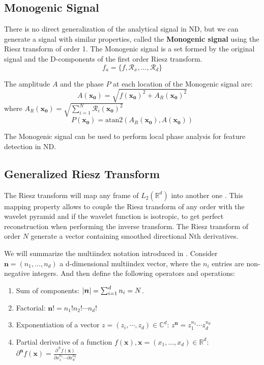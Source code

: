 \documentclass{InsightArticle}
\theoremstyle{definition}
\def\vn{\bm{n}} %
\def\vx{\bm{x}} %
\begin{document}
\subsection{Monogenic Signal}
\label{sub:monogenic}

There is no direct generalization of the analytical signal in ND, but we can generate a signal with similar properties, called the \textbf{Monogenic signal} using the Riesz transform of order 1\cite{felsberg_monogenic_2001, kovesi_image_1999}.
The Monogenic signal is a set formed by the original signal and the D-components of the first order Riesz transform.
\begin{equation}
  f_a = \{f, \mathcal{R}_x, ..., \mathcal{R}_d\}
\end{equation}

The amplitude $A$ and the phase $P$ at each location of the Monogenic signal are:
\begin{equation}
\label{eq:monogenic_amplitude}
 A(\mathbf{x_0})= \sqrt{f(\mathbf{x_0})^2 + A_R(\mathbf{x_0})^2 }
\end{equation}
where $ A_R(\mathbf{x_0})=  \sqrt{\sum_{i=1}^N \mathcal{R}_i(\mathbf{x_0})^2} $
\begin{equation}
\label{eq:monogenic_phase}
P(\mathbf{x_0})= \text{atan2}(A_R(\mathbf{x_0}),A(\mathbf{x_0}))
\end{equation}

The Monogenic signal can be used to perform local phase analysis for feature detection in ND.

\subsection{Generalized Riesz Transform}
\label{sub:generalized_riesz}
The Riesz transform will map any frame of $L_2(\mathbb{R}^d)$ into another one \cite{held_steerable_2010, unser_wavelet_2010}. This mapping property allows to couple the Riesz transform of any order with the wavelet pyramid and if the wavelet function is isotropic, to get perfect reconstruction when performing the inverse transform. The Riesz transform of order $N$ generate a vector containing smoothed directional Nth derivatives.

We will summarize the multiindex notation introduced in \cite{unser_steerable_2011}.\newline
Consider $ \vn = (n_{1}, \ldots, n_{d})$ a d-dimensional multiindex vector, where the $n_i$ entries are non-negative integers. And then define the following operators and operations:
\begin{enumerate}[topsep=0pt]
  \item Sum of components: $\abs{\bm{n}} = \sum_{i=1}^d n_i = N$.
  \item Factorial: $\vn! = n_1!n_2!\cdots n_d!$
  \item Exponentiation of a vector $z = (z_i,\cdots,z_d) \in \mathbb{C}^d$:
    $z^{\vn} = z_{1}^{n_1} \cdots z_{d}^{n_d}$
  \item Partial derivative of a function $f(\vx), \vx = (x_1,\ldots, x_d) \in \mathbb{R}^d$:
    $\partial^{\vn}f(\vx) = \frac{\partial^{N}f(\vx)}{\partial x_{1}^{n_1}\cdots \partial x_{d}^{n_d}}$
\end{enumerate}
\end{document}
